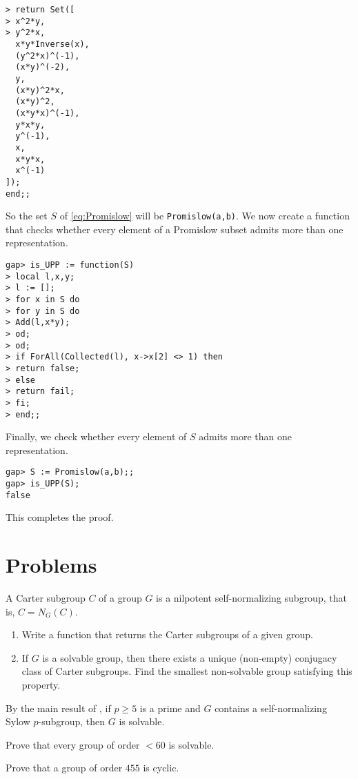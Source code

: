 \begin{example}
\begin{lstlisting}
> return Set([
> x^2*y,
> y^2*x,
  x*y*Inverse(x),
  (y^2*x)^(-1),
  (x*y)^(-2),
  y,
  (x*y)^2*x,
  (x*y)^2,
  (x*y*x)^(-1),
  y*x*y,
  y^(-1),
  x,
  x*y*x,
  x^(-1)
]);
end;;
\end{lstlisting}
So the set $S$ of \eqref{eq:Promislow} 
will be \lstinline{Promislow(a,b)}. We now
create a function that checks whether
every element of a Promislow subset 
admits more than one representation.
\begin{lstlisting}
gap> is_UPP := function(S)
> local l,x,y;
> l := [];
> for x in S do
> for y in S do
> Add(l,x*y);
> od;
> od;
> if ForAll(Collected(l), x->x[2] <> 1) then
> return false;
> else
> return fail;
> fi;
> end;;
\end{lstlisting}
Finally, we check whether every element of 
$S$ admits more than one representation.
\begin{lstlisting}
gap> S := Promislow(a,b);;
gap> is_UPP(S);
false
\end{lstlisting}
This completes the proof. 
\end{example}

\section{Problems}

\begin{prob}
A Carter subgroup $C$ of a group $G$ is a nilpotent self-normalizing subgroup, that is, $C = N_G(C)$.
\begin{enumerate}
    \item Write a function that returns the Carter subgroups of a given group.
    \item If $G$ is a solvable group, then there exists a unique (non-empty) conjugacy class of Carter subgroups.
    Find the smallest non-solvable group satisfying this property.
\end{enumerate}
By the main result of \cite{MR2045411}, if $p\geq 5$ is a prime and $G$ contains a self-normalizing Sylow $p$-subgroup, then $G$ is solvable.
\end{prob}


\begin{prob}
  Prove that every group of order $<60$ is solvable.
\end{prob}


\begin{prob}
  Prove that a group of order $455$ is cyclic.
\end{prob}

